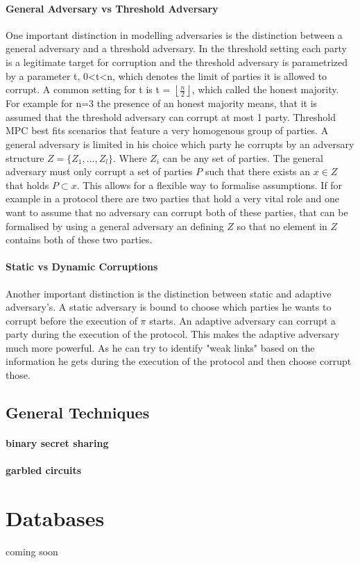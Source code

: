 \paragraph{General Adversary vs Threshold Adversary}
One important distinction in modelling adversaries is the distinction between a general adversary and a threshold adversary.
In the threshold setting each party is a legitimate target for corruption and the threshold adversary is parametrized by a parameter t, 0<t<n, which denotes the limit of parties it is allowed to corrupt. A common setting for t is t = $\left \lfloor{ \frac{n}{2} }\right \rfloor  $, which called the honest majority. For example for n=3 the presence of an honest majority means, that it is assumed that the threshold adversary can corrupt at most 1 party. Threshold MPC best fits scenarios that feature a very homogenous group of parties. A general adversary is limited in his choice which party he corrupts by an adversary structure  
$ Z = \{ Z_1, \dots, Z_l  \} $. Where $ Z_i $ can be any set of parties. The general adversary must only corrupt a set of parties  $ P $ such that there exists an $ x \in Z $ that holds $ P \subset x $. This allows for a flexible way to formalise assumptions. If for example in a protocol there are two parties that hold a very vital role and one want to assume that no adversary can corrupt both of these parties, that can be formalised by using a general adversary an defining $ Z $ so that no element in  $Z $ contains both of these two parties.  
 
\paragraph{Static vs Dynamic Corruptions}
Another important distinction is the distinction between static and adaptive adversary's. A static adversary is bound to choose which parties he wants to corrupt before the execution of $ \pi $ starts. An adaptive adversary can corrupt a party during the execution of the protocol. This makes the adaptive adversary much more powerful. As he can try to identify "weak links" based on the information he gets during the execution of the protocol and then choose corrupt those.   


\subsection{General Techniques}
\paragraph{binary secret sharing} 
\paragraph{garbled circuits}

\section{Databases}
\label{Databases}
coming soon
